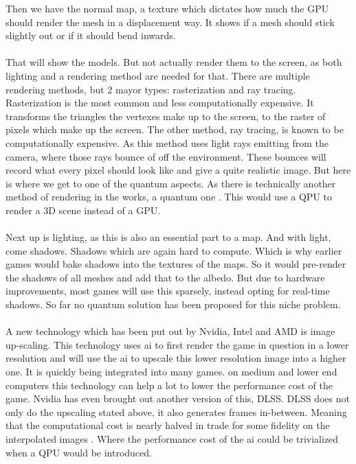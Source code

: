 Then we have the normal map, a texture which dictates how much the GPU should render the mesh in a displacement way. It shows if a mesh should stick slightly out or if it should bend inwards. 
\\\\
That will show the models. But not actually render them to the screen, as both lighting and a rendering method are needed for that. There are multiple rendering methods, but 2 mayor types: rasterization and ray tracing. Rasterization is the most common and less computationally expensive. It transforms the triangles the vertexes make up to the screen, to the raster of pixels which make up the screen. The other method, ray tracing, is known to be computationally expensive. As this method uses light rays emitting from the camera, where those rays bounce of off the environment. These bounces will record what every pixel should look like and give a quite realistic image. But here is where we get to one of the quantum aspects. As there is technically another method of rendering in the works, a quantum one \cite{quantumRender}. This would use a QPU to render a 3D scene instead of a GPU. 
\\\\
Next up is lighting, as this is also an essential part to a map. And with light, come shadows. Shadows which are again hard to compute. Which is why earlier games would bake shadows into the textures of the maps. So it would pre-render the shadows of all meshes and add that to the albedo. But due to hardware improvements, most games will use this sparsely, instead opting for real-time shadows. So far no quantum solution has been proposed for this niche problem.
\\\\
A new technology which has been put out by Nvidia, Intel and AMD is image up-scaling. This technology uses ai to first render the game in question in a lower resolution and will use the ai to upscale this lower resolution image into a higher one. It is quickly being integrated into many games. on medium and lower end computers this technology can help a lot to lower the performance cost of the game. Nvidia has even brought out another version of this, DLSS. DLSS does not only do the upscaling stated above, it also generates frames in-between. Meaning that the computational cost is nearly halved in trade for some fidelity on the interpolated images \cite{Dlss}. Where the performance cost of the ai could be trivialized when a QPU would be introduced.
\\\\
